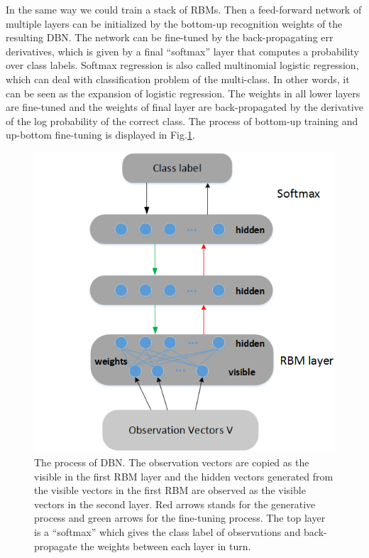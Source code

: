 \documentclass{llncs}
\begin{document}
In the same way we could train a stack of RBMs. Then a feed-forward network of multiple layers can be initialized by the bottom-up recognition weights of the resulting DBN. The network can be fine-tuned by the back-propagating err derivatives, which is given by a final “softmax” layer that computes a probability over class labels. Softmax regression is also called multinomial logistic regression, which can deal with classification problem of the multi-class. In other words, it can be seen as the expansion of logistic regression. The weights in all lower layers are fine-tuned and the weights of final layer are back-propagated by the derivative of the log probability of the correct class. The process of bottom-up training and up-bottom fine-tuning is displayed in Fig.\ref{fig:2}.
\begin{figure}[!htbp]
	\begin{center}
		\includegraphics[scale=0.45]{figs/DBN.png}
	\end{center}
\caption{The process of DBN. The observation vectors are copied as the visible in the first RBM layer and the hidden vectors generated from the visible vectors in the first RBM are observed as the visible vectors in the second layer. Red arrows stands for the generative process and green arrows for the fine-tuning process. The top layer is a “softmax” which gives the class label of observations and back-propagate the weights between each layer in turn.}
\label{fig:2}
\end{figure}
\end{document}

